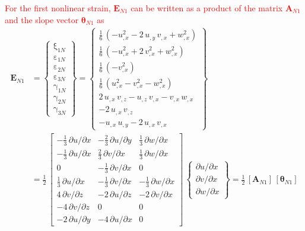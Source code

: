 \textcolor{red}{For the first nonlinear strain, $\mathbf{E}_{N1}$ can be written as a product of the matrix $\mathbf{A}_{N1}$ and the slope vector $\boldsymbol{\theta}_{N1}$ as} 
\begin{equation}
\begin{aligned}
\mathbf{E}_{N1} & =  \begin{Bmatrix}
\mathrm \xi_{1N} \\
\mathrm \varepsilon_{1N} \\
\mathrm \varepsilon_{2N} \\
\mathrm \varepsilon_{3N} \\
\mathrm \gamma_{1N} \\
\mathrm \gamma_{2N} \\
\mathrm \gamma_{3N} \end{Bmatrix} =
\begin{Bmatrix}
\tfrac{1}{6} \,  \left( -u_{,x}^2 - 2 \, u_{,y} \, v_{,x}  +  w_{,x}^2  \right)\\
\tfrac{1}{6} \,  \left( -u_{,x}^2 + 2 \, v_{,x}^2 +  w_{,x}^2 \right) \\
\tfrac{1}{6} \,  \left( - v_{,x}^2 \right) \\
\tfrac{1}{6} \,  \left( u_{,x}^2 - v_{,x}^2 -  w_{,x}^2  \right) \\ 
2 \, u_{,x} \, v_{,z} - u_{,z} \, v_{,x} - v_{,x} \, w_{,x} \\
- 2 \, u_{,x} \, v_{,z} \\ 
- u_{,x} \, u_{,y} - 2 \, u_{,x} \, v_{,x}\end{Bmatrix} \\
& = \frac{1}{2} \, \begin{bmatrix}
-\tfrac{1}{3} \, \partial u / \partial x &  - \tfrac{2}{3} \, \partial u / \partial y & \tfrac{1}{3} \, \partial w / \partial x  \\
-\tfrac{1}{3} \, \partial u / \partial x &  \tfrac{2}{3} \, \partial v / \partial x & \tfrac{1}{3} \, \partial w / \partial x  \\
0  & -\tfrac{1}{3} \, \partial v / \partial x & 0 \\
\tfrac{1}{3} \, \partial u / \partial x &  - \tfrac{1}{3} \, \partial v / \partial x & - \tfrac{1}{3} \, \partial w / \partial x  \\
4 \, \partial v / \partial z &  - 2 \, \partial u / \partial z & - 2 \,  \partial v / \partial x  \\
- 4 \, \partial v / \partial z &  0 & 0  \\
- 2 \, \partial u / \partial y &  - 4 \, \partial u / \partial x & 0   \end{bmatrix} \, \begin{Bmatrix}
\partial u / \partial x\\
\partial v / \partial x \\
\partial w / \partial x
\end{Bmatrix}
= \tfrac{1}{2} \, [\mathbf{A}_{N1}] \, [\boldsymbol{\theta}_{N1}]
\end{aligned}
\end{equation}

